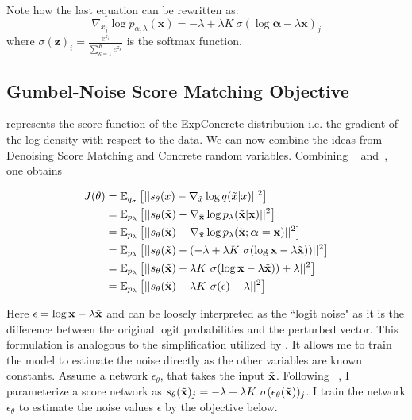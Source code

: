 Note how the last equation can be rewritten as:
\begin{equation}
\label{eq:concrete_score}
     \nabla_{x_j} \log p_{\alpha, \lambda}(\mathbf{x}) = - \lambda + \lambda K~\sigma(\log \boldsymbol{\alpha} - \lambda \mathbf{x})_j
\end{equation}
where $\sigma(\mathbf{z})_i = \frac{e^{z_i}}{ \sum_{k=1}^{K} e^{z_k}}$ is the softmax function. 

\subsection*{Gumbel-Noise Score Matching Objective}
 represents the score function of the ExpConcrete distribution i.e. the gradient of the log-density with respect to the data. We can now combine the ideas from Denoising Score Matching and Concrete random variables.
Combining ~ and~, one obtains

\begin{align*}
\label{eq:cdsm}
    J(\theta) &= \mathbb{E}_{q_{\sigma}} \left[ { || s_\theta(x) - \nabla_{\Tilde{x}} \log q(\tilde{x} | x) ||^2 } \right]\\
     &= \mathbb{E}_{p_{\lambda}} \left[ { || s_\theta(\Tilde{\mathbf{x}}) - \nabla_{\Tilde{\mathbf{x}}} \log p_\lambda(\tilde{\mathbf{x}} | \mathbf{x}) ||^2 } \right] \\
     &= \mathbb{E}_{p_{\lambda}} \left[ { || s_\theta(\Tilde{\mathbf{x}}) - \nabla_{\Tilde{\mathbf{x}}} \log p_\lambda(\tilde{\mathbf{x}} ; \boldsymbol{\alpha} = \mathbf{x}) ||^2 } \right] \\
     &= \mathbb{E}_{p_{\lambda}} \left[ { || s_\theta(\Tilde{\mathbf{x}}) - (- \lambda + \lambda K~\sigma(\log \mathbf{x} - \lambda \Tilde{\mathbf{x}})) ||^2 } \right] \\
     &= \mathbb{E}_{p_{\lambda}} \left[ { || s_\theta(\Tilde{\mathbf{x}}) - \lambda K~\sigma(\log \mathbf{x} - \lambda \Tilde{\mathbf{x}}))  + \lambda ||^2 } \right] \\
     &= \mathbb{E}_{p_{\lambda}} \left[ { || s_\theta(\Tilde{\mathbf{x}}) - \lambda K~\sigma(\epsilon)  + \lambda ||^2 } \right]
\end{align*}

Here $\epsilon=\log \mathbf{x} - \lambda \Tilde{\mathbf{x}}$ and can be loosely interpreted as the ``logit noise" as it is the difference between the original logit probabilities and the perturbed vector. This formulation is analogous to the simplification utilized by \cite{song2020score,ho2020denoising}. It allows me to train the model to estimate the noise directly as the other variables are known constants. Assume a network $\epsilon_\theta$, that takes the input $\Tilde{\mathbf{x}}$. Following ~, I parameterize a score network as $s_\theta(\Tilde{\mathbf{x}})_j = - \lambda + \lambda K~\sigma(\epsilon_\theta(\Tilde{\mathbf{x}}))_j$. I train the network $\epsilon_\theta$ to estimate the noise values $\epsilon$ by the objective below.  

